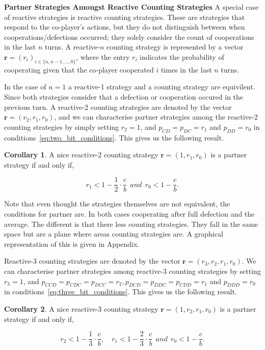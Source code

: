 \documentclass{article}
\theoremstyle{definition}
\newtheorem{corollary}{Corollary}[theorem]
\begin{document}
\textbf{Partner Strategies Amongst Reactive Counting Strategies}
A special case of reactive strategies is reactive counting strategies. These are
strategies that respond to the co-player's actions, but they do not distinguish
between when cooperations/defections occurred; they solely consider the count of
cooperations in the last $n$ turns. A reactive-$n$ counting strategy is represented
by a vector $\mathbf{r}=(r_i)_{i \in \{n, n -1, \dots, 0\}}$, where the entry \(r_i\)
indicates the probability of cooperating given that the co-player cooperated
\(i\) times in the last \(n\) turns.

In the case of $n=1$ a reactive-1 strategy and a counting strategy are
equivilent. Since both strategies consider that a defection or cooperation
occured in the previous turn. A reactive-2 counting strategies are denoted by
the vector $\mathbf{r}=(r_2, r_1, r_0)$, and we can characterise partner
strategies among the reactive-2 counting strategies by simply setting $r_2 = 1$,
and $p_{CD} = p_{DC} = r_1$ and $p_{DD} = r_0$ in
conditions~\eqref{eq:two_bit_conditions}. This gives us the following result.

\begin{corollary}
A nice reactive-2 counting strategy $\mathbf{r} = (1, r_1, r_0)$ is a partner strategy if and only if,

\begin{equation}\label{eq:counting_two_bit_conditions}
  \displaystyle r_1 < 1-\frac{1}{2} \cdot \frac{c}{b} ~~and~~ r_0 < 1\!-\! \frac{c}{b}.
\end{equation}
\end{corollary}

Note that even thought the strategies themselves are not equivalent, the
conditions for partner are. In both cases cooperating after full defection and
the average. The different is that there less counting strategies. They fall in
the same space but are a plane where areas counting strategies are. A graphical
representation of this is given in Appendix.


Reactive-3 counting strategies are denoted by the vector $\mathbf{r}=(r_3,
r_2, r_1, r_0)$. We can characterise partner strategies among reactive-3
counting strategies by setting $r_3 = 1$, and $p_{CCD} = p_{CDC} = p_{DCC} =
r_2, p_{DCD} = p_{DDC} = p_{CDD} = r_1$ and $p_{DDD} = r_0$ in
conditions~\eqref{eq:three_bit_conditions}. This gives us the following result.

\begin{corollary}
A nice reactive-3 counting strategy $\mathbf{r} = (1, r_2, r_1, r_0)$ is a partner strategy if and only if,

\begin{equation}\label{eq:counting_three_bit_conditions}
  \displaystyle r_2 < 1- \frac{1}{3} \cdot \frac{c}{b}, \quad r_1 < 1- \frac{2}{3} \cdot \frac{c}{b} ~~and~~ r_0 < 1\!-\! \frac{c}{b}.
\end{equation}
\end{corollary}
\end{document}
